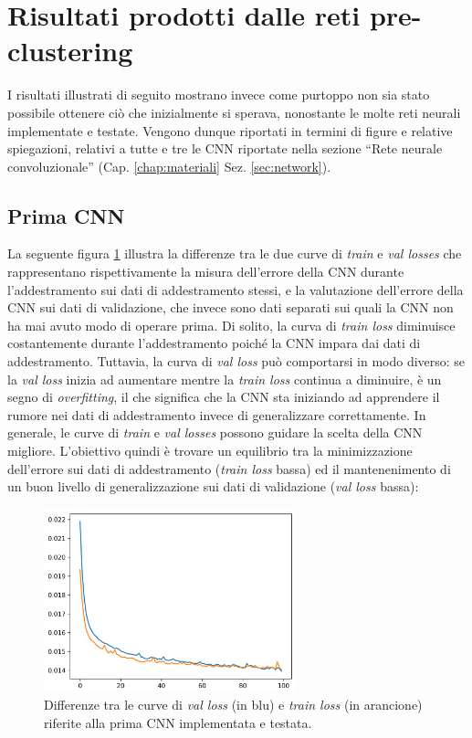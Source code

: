 \documentclass[12pt,italian]{report}
\begin{document}
	
	\section{Risultati prodotti dalle reti pre-clustering}
	\label{sec:network_risultati}
	
	I risultati illustrati di seguito mostrano invece come purtoppo non sia stato possibile ottenere ciò che inizialmente si sperava, nonostante le molte reti neurali implementate e testate. Vengono dunque riportati in termini di figure e relative spiegazioni, relativi a tutte e tre le CNN riportate nella sezione ``Rete neurale convoluzionale'' (Cap. \ref{chap:materiali} Sez. \ref{sec:network}).
	
	
	\subsection{Prima CNN}
	\label{subsec:prima_risultati}
	
	La seguente figura \ref{fig:prima_cnn_primo_plot} illustra la differenze tra le due curve di \textit{train} e \textit{val losses} che rappresentano rispettivamente la misura dell'errore della CNN durante l'addestramento sui dati di addestramento stessi, e la valutazione dell'errore della CNN sui dati di validazione, che invece sono dati separati sui quali la CNN non ha mai avuto modo di operare prima. Di solito, la curva di \textit{train loss} diminuisce costantemente durante l'addestramento poiché la CNN impara dai dati di addestramento. Tuttavia, la curva di \textit{val loss} può comportarsi in modo diverso: se la \textit{val loss} inizia ad aumentare mentre la \textit{train loss} continua a diminuire, è un segno di \textit{overfitting}, il che significa che la CNN sta iniziando ad apprendere il rumore nei dati di addestramento invece di generalizzare correttamente. In generale, le curve di \textit{train} e \textit{val losses} possono guidare la scelta della CNN migliore. L'obiettivo quindi è trovare un equilibrio tra la minimizzazione dell'errore sui dati di addestramento (\textit{train loss} bassa) ed il mantenenimento di un buon livello di generalizzazione sui dati di validazione (\textit{val loss} bassa):
	
	\begin{figure}[H]
		\centering
		\includegraphics[width=0.65\textwidth]{immagini/prima_cnn_primo_plot.png}
		\captionsetup{justification=centering}
		\caption{Differenze tra le curve di \textit{val loss} (in blu) e \textit{train loss} (in arancione) riferite alla prima CNN implementata e testata.}
		\label{fig:prima_cnn_primo_plot}
	\end{figure}
	
\end{document}
